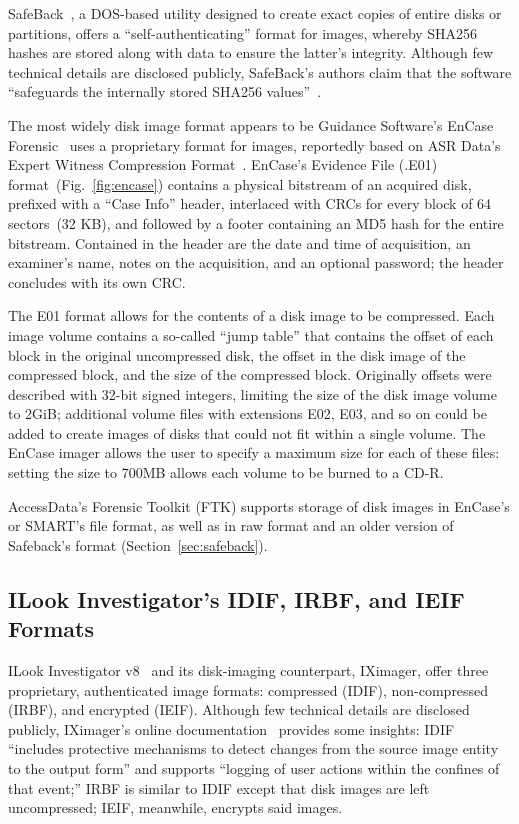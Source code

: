 \documentclass[11pt,letter]{article}
\begin{document}
SafeBack~\cite{safeback}, a DOS-based utility designed to create
exact copies of entire disks or partitions, offers a
``self-authenticating'' format for images, whereby SHA256 hashes are
stored along with data to ensure the latter's integrity.  Although
few technical details are disclosed publicly, SafeBack's authors
claim that the software ``safeguards the internally stored SHA256
values''~\cite{safebacksafeguards}.


The most widely disk image format appears to be Guidance Software's EnCase Forensic~\cite{encase} uses
a proprietary format for images, reportedly based on ASR Data's
Expert Witness Compression Format~\cite{ew}.  EnCase's Evidence File
(.E01) format~(Fig.~\ref{fig:encase}) contains a physical bitstream
of an acquired disk, prefixed with a ``Case Info'' header,
interlaced with CRCs for every block of 64 sectors~(32 KB), and
followed by a footer containing an MD5 hash for the entire
bitstream.  Contained in the header are the date and time of
acquisition, an examiner's name, notes on the acquisition, and an
optional password; the header concludes with its own CRC. 

The E01 format allows for the contents of a disk image to be
compressed. Each image volume contains a so-called ``jump table'' that
contains the offset of each block in the original uncompressed disk,
the offset in the disk image of the compressed block, and the size of
the compressed block. Originally offsets were described with 32-bit
signed integers, limiting the size of the disk image volume to 2GiB;
additional volume files with extensions E02, E03, and so on could be
added to create images of disks that could not fit within a single
volume. The EnCase imager allows the user to specify a maximum size
for each of these files: setting the size to 700MB allows each volume
to be burned to a CD-R. 

AccessData's Forensic Toolkit (FTK)
supports storage of disk images in EnCase's or SMART's file format,
as well as in raw format and an older version of Safeback's format
(Section~\ref{sec:safeback}). 

\subsection{ILook Investigator's IDIF, IRBF, and IEIF Formats}
ILook Investigator v8~\cite{ILookv8} and its disk-imaging
counterpart, IXimager, offer three proprietary, authenticated image
formats: compressed (IDIF), non-compressed (IRBF), and encrypted
(IEIF). Although few technical details are disclosed publicly,
IXimager's online documentation~\cite{IXimager} provides some
insights:  IDIF ``includes protective mechanisms to detect changes
from the source image entity to the output form'' and supports
``logging of user actions within the confines of that event;''  IRBF
is similar to IDIF except that disk images are left uncompressed;
IEIF, meanwhile, encrypts said images.
\end{document}
